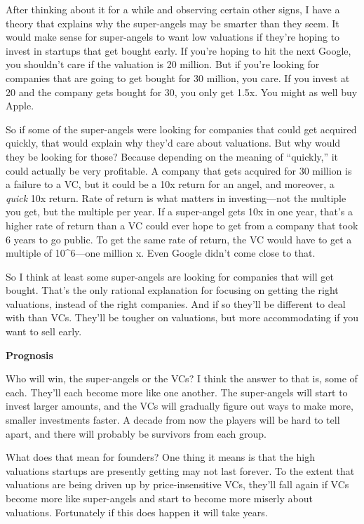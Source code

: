 \documentclass[12pt]{book}
\begin{document}
After thinking about it for a while and observing certain other signs, I
have a theory that explains why the super-angels may be smarter than
they seem. It would make sense for super-angels to want low valuations
if they're hoping to invest in startups that get bought early. If you're
hoping to hit the next Google, you shouldn't care if the valuation is 20
million. But if you're looking for companies that are going to get
bought for 30 million, you care. If you invest at 20 and the company
gets bought for 30, you only get 1.5x. You might as well buy Apple.

So if some of the super-angels were looking for companies that could get
acquired quickly, that would explain why they'd care about valuations.
But why would they be looking for those? Because depending on the
meaning of ``quickly,'' it could actually be very profitable. A company
that gets acquired for 30 million is a failure to a VC, but it could be
a 10x return for an angel, and moreover, a \emph{quick} 10x return. Rate
of return is what matters in investing---not the multiple you get, but
the multiple per year. If a super-angel gets 10x in one year, that's a
higher rate of return than a VC could ever hope to get from a company
that took 6 years to go public. To get the same rate of return, the VC
would have to get a multiple of 10\^{}6---one million x. Even Google
didn't come close to that.

So I think at least some super-angels are looking for companies that
will get bought. That's the only rational explanation for focusing on
getting the right valuations, instead of the right companies. And if so
they'll be different to deal with than VCs. They'll be tougher on
valuations, but more accommodating if you want to sell early.

\textbf{Prognosis}

Who will win, the super-angels or the VCs? I think the answer to that
is, some of each. They'll each become more like one another. The
super-angels will start to invest larger amounts, and the VCs will
gradually figure out ways to make more, smaller investments faster. A
decade from now the players will be hard to tell apart, and there will
probably be survivors from each group.

What does that mean for founders? One thing it means is that the high
valuations startups are presently getting may not last forever. To the
extent that valuations are being driven up by price-insensitive VCs,
they'll fall again if VCs become more like super-angels and start to
become more miserly about valuations. Fortunately if this does happen it
will take years.
\end{document}
